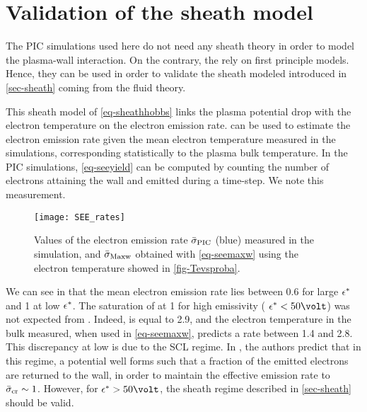 
\section{Validation of the sheath model }
  \label{sec-sheath_validation}
  
  The \ac{PIC} simulations used here do not need any sheath theory in order to model the plasma-wall interaction.
  On the contrary, the rely on first principle models.
  Hence, they can be used in order to validate the sheath modeled introduced in \vref{sec-sheath} coming from the fluid theory.
  
  This sheath model of \vref{eq-sheathhobbs} links the plasma potential drop with the electron temperature on the electron emission rate.
   can be used to estimate the electron emission rate given the mean electron temperature measured in the simulations, corresponding statistically to the plasma bulk temperature.   
  In the \ac{PIC} simulations, \cref{eq-seeyield} can be computed by counting the number of electrons attaining the wall and emitted during a time-step.
  We note \ratepic this measurement.
  \vspace{1em}
   
  \begin{figure}[hbtp]
    \centering
    \texttt{[image: SEE\_rates]}
    \caption{Values of the electron emission rate $ \bar{\sigma }_{\rm PIC}$ (blue) measured in the simulation, and $  \bar{\sigma }_{\rm Maxw}$ obtained with \cref{eq-seemaxw} using the electron temperature showed in \cref{fig-Tevsproba}. }
    \label{fig-seeparamesMaxw}
  \end{figure}
  
  
  We can see in  that the mean electron emission rate lies between 0.6 for large $\epsilon^{*}$ and 1 at low $\epsilon^{*}$.
  The saturation of \ratepic at 1 for high emissivity ( $\crover < 50 \volt$) was not expected from \ratemaxw.
  Indeed, \probamax is equal to 2.9, and the electron temperature in the bulk measured, when used in \cref{eq-seemaxw}, predicts a rate between 1.4 and 2.8.
  This discrepancy at low \crover is due to the \ac{SCL} regime.
  In \citet{hobbs1967}, the authors predict that in this regime, a potential well forms such that a fraction of the emitted electrons are returned to the wall, in order to maintain the effective emission rate to $ \bar{\sigma }_{\rm cr}\sim1$.
  However, for $\crover > 50 \volt$, the sheath regime described in \vref{sec-sheath} should be valid.
   

